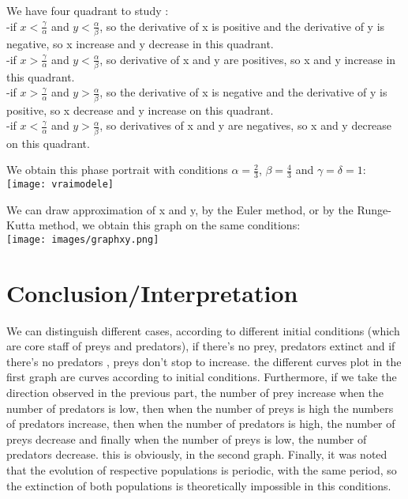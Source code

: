 \documentclass[a4paper,16pt,twoside]{report}
\begin{document}
    
    
       We have four quadrant to study :\\
    -if $x < \frac{\gamma}{\alpha}$ and $y < \frac{\alpha}{\beta}$, so the derivative of x is positive and the derivative of y is negative, so x increase and y decrease in this quadrant.\\
    -if $x > \frac{\gamma}{\alpha}$ and $y < \frac{\alpha}{\beta}$, so derivative of x and y are positives, so x and y increase in this quadrant.\\
    -if $x > \frac{\gamma}{\alpha}$ and $y > \frac{\alpha}{\beta}$, so the derivative of x is negative and the derivative of y is positive, so x decrease and y increase on this quadrant.\\
    -if $x < \frac{\gamma}{\alpha}$ and $y > \frac{\alpha}{\beta}$, so derivatives of x and y are negatives, so x and y decrease on this quadrant.\\
    \newpage



We obtain this phase portrait with conditions $\alpha = \frac{2}{3}$, $\beta = \frac{4}{3}$ and $\gamma = \delta = 1$:\\
\texttt{[image: vraimodele]}

\newpage
We can draw approximation of x and y, by the Euler method, or by the Runge-Kutta method, we obtain this graph on the same conditions: \\

\texttt{[image: images/graphxy.png]}



\chapter{Conclusion/Interpretation}

We can distinguish different cases, according to different initial conditions (which are core staff of preys and predators), if there's no prey, predators extinct and if there's no predators , preys don't stop to increase. the different curves plot in the first graph are curves according to initial conditions. Furthermore, if we take the direction observed in the previous part, the number of prey increase when the number of predators is low, then when the number of preys is high the numbers of predators increase, then when the number of predators is high, the number of preys decrease and finally when the number of preys is low, the number of predators decrease. this is obviously, in the second graph. Finally, it was noted that the evolution of respective populations is periodic, with the same period, so the extinction of both populations is theoretically impossible in this conditions.
\end{document}
